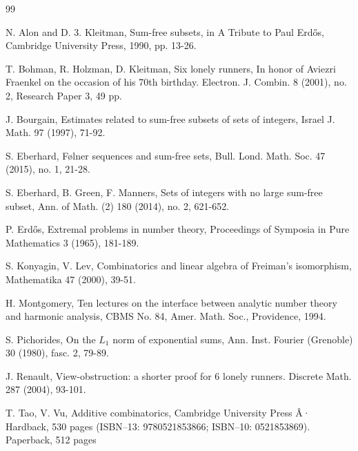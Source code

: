 \documentclass[12pt,reqno]{amsart}
\theoremstyle{dotless}
\begin{document}
\begin{thebibliography}{99}


  N. Alon and D. 3. Kleitman, Sum-free subsets, in A Tribute to Paul Erd\H{o}s,
Cambridge University Press, 1990, pp. 13-26.

 T. Bohman, R. Holzman, D. Kleitman, Six lonely runners, In honor of Aviezri Fraenkel on the occasion of his 70th birthday. Electron. J. Combin. 8 (2001), no. 2, Research Paper 3, 49 pp.

 J. Bourgain, Estimates related to sum-free subsets of sets of integers, Israel J. Math. 97 (1997), 71-92. 

 S. Eberhard, Følner sequences and sum-free sets, Bull. Lond. Math. Soc. 47 (2015), no. 1, 21-28. 

 S. Eberhard, B. Green, F. Manners, Sets of integers with no large sum-free subset, Ann. of Math. (2)
180 (2014), no. 2, 621-652.

 P. Erd\H{o}s, Extremal problems in number theory, Proceedings of Symposia in Pure Mathematics 3 (1965), 181-189.

 S. Konyagin, V. Lev, Combinatorics and linear algebra of Freiman's isomorphism, Mathematika 47 (2000), 39-51.

 H. Montgomery, Ten lectures on the interface between analytic number theory and harmonic analysis, CBMS No. 84, Amer. Math. Soc., Providence, 1994.

 S. Pichorides, On the $L_1$ norm of exponential sums, Ann. Inst. Fourier (Grenoble) 30 (1980), fasc. 2, 79-89.

 J. Renault, View-obstruction: a shorter proof for 6 lonely runners. Discrete Math. 287 (2004), 93-101. 

 T. Tao, V. Vu, Additive combinatorics, Cambridge University Press Â· Hardback, 530 pages (ISBN--13: 9780521853866; ISBN--10: 0521853869). Paperback, 512 pages

\end{thebibliography}
\end{document}
